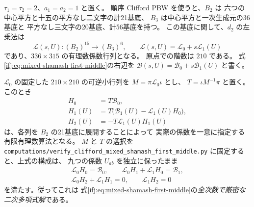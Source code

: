 \begin{proposition}[標準二因子の全九係数に対する厳密有理数係数構成]
\label{ifj:prop:mixed-shamash-nine-parameter-certificate}
$\tau_1=\tau_2=2$、$a_1=a_2=1$ と置く。
順序 Clifford PBW を使うと、$B_2$ は
六つの中心平方と十五の平方なし二文字の計21基底、
$B_3$ は中心平方と一次生成元の36基底と
平方なし三文字の20基底、計56基底を持つ。
この基底に関して、$d_2$ の左乗法は
\[
 \mathcal L(s,U):(B_2)^{15}\to(B_3)^6,
 \qquad \mathcal L(s,U)=\mathcal L_0+s\mathcal L_1(U)
\]
であり、$336\times315$ の有理数係数行列となる。
原点での階数は $210$ である。
式\eqref{ifj:eq:mixed-shamash-first-middle}の右辺を
$\mathcal B(s,U)=\mathcal B_0+s\mathcal B_1(U)$ と書く。

$\mathcal L_0$ の固定した $210\times210$ の可逆小行列を
$M=\pi\mathcal L_0\iota$ とし、
$T=\iota M^{-1}\pi$ と置く。
このとき
\begin{equation}\label{ifj:eq:mixed-shamash-reconstruction}
 \begin{aligned}
 H_0&=T\mathcal B_0,\\
 H_1(U)&=T\bigl(\mathcal B_1(U)-\mathcal L_1(U)H_0\bigr),\\
 H_2(U)&=-T\mathcal L_1(U)H_1(U)
 \end{aligned}
\end{equation}
は、各列を $B_2$ の21基底に展開することによって
実際の係数を一意に指定する有限有理数算法となる。
$M$ と $T$ の選択を
\texttt{computations/verify\_clifford\_mixed\_shamash\_first\_middle.py}
に固定すると、上式の構成は、
九つの係数 $U_{ab}$ を独立に保ったまま
\begin{equation}\label{ifj:eq:mixed-shamash-certificate-identities}
 \begin{gathered}
 \mathcal L_0H_0=\mathcal B_0,\qquad
 \mathcal L_0H_1+\mathcal L_1H_0=\mathcal B_1,\\
 \mathcal L_0H_2+\mathcal L_1H_1=0,\qquad
 \boxed{\mathcal L_1H_2=0}
 \end{gathered}
\end{equation}
を満たす。従ってこれは
式\eqref{ifj:eq:mixed-shamash-first-middle}の\emph{全次数で厳密な二次多項式解}である。
\end{proposition}

